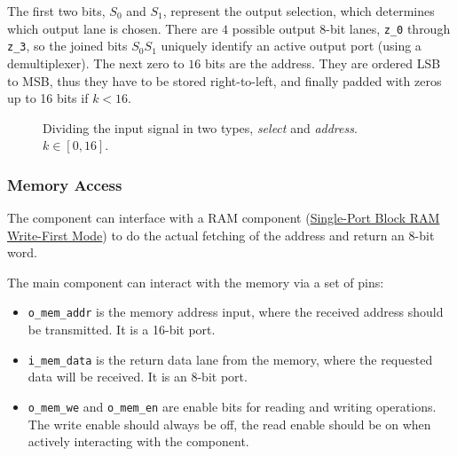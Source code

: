 \documentclass[12pt,a4paper]{article}
\newcommand{\code}{\texttt}
\begin{document}
	
	
	The first two bits, $S_0$ and $S_1$, represent the output selection, which determines which output lane is chosen. There are $4$ possible output 8-bit lanes, \code{z\_0} through \code{z\_3}, so the joined bits $S_0 S_1$ uniquely identify an active output port (using a demultiplexer).
	The next zero to $16$ bits are the address. They are ordered LSB to MSB, thus they have to be stored right-to-left, and finally padded with zeros up to 16 bits if $k < 16$.
	

	\begin{figure}[htb]
		\centering
		
		\centering
		\caption{Dividing the input signal in two types, \textit{select} and \textit{address}. $k \in [0,16]$.}
	\end{figure}
	
	
	
	\subsubsection{Memory Access}
	
	The component can interface with a RAM component (\href{https://docs.xilinx.com/v/u/2017.3-English/ug901-vivado-synthesis}{Single-Port Block RAM Write-First Mode}) to do the actual fetching of the address and return an 8-bit word.
	
	The main component can interact with the memory via a set of pins:
	
	\begin{itemize}
		\item \code{o\_mem\_addr} is the memory address input, where the received address should be transmitted. It is a 16-bit port.
		\item \code{i\_mem\_data} is the return data lane from the memory, where the requested data will be received. It is an 8-bit port.
		\item \code{o\_mem\_we} and \code{o\_mem\_en} are enable bits for reading and writing operations. The write enable should always be off, the read enable should be on when actively interacting with the component.
	\end{itemize}
	
\end{document}
